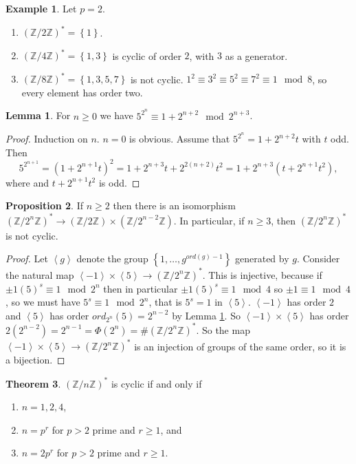 \documentclass{article}
\newcommand{\Z}{\mathbb{Z}}
\newcommand{\rb}[1]{\left( #1 \right)}
\newcommand{\cb}[1]{\left\{ #1 \right\}}
\newcommand{\ab}[1]{\left\langle #1 \right\rangle}
\theoremstyle{definition}\newtheorem{definition}{Definition}
\theoremstyle{definition}\newtheorem*{remark}{Remark}
\theoremstyle{definition}\newtheorem*{example}{Example}
\theoremstyle{definition}\newtheorem*{note}{Note}
\newtheorem{proposition}[definition]{Proposition}
\newtheorem{lemma}[definition]{Lemma}
\newtheorem{theorem}[definition]{Theorem}
\begin{document}
\begin{example}
Let $ p = 2 $.
\begin{enumerate}
\item $ \rb{\Z / 2\Z}^* = \cb{1} $.
\item $ \rb{\Z / 4\Z}^* = \cb{1, 3} $ is cyclic of order $ 2 $, with $ 3 $ as a generator.
\item $ \rb{\Z / 8\Z}^* = \cb{1, 3, 5, 7} $ is not cyclic. $ 1^2 \equiv 3^2 \equiv 5^2 \equiv 7^2 \equiv 1 \mod 8 $, so every element has order two.
\end{enumerate}
\end{example}

\begin{lemma}
\label{lem:27}
For $ n \ge 0 $ we have $ 5^{2^n} \equiv 1 + 2^{n + 2} \mod 2^{n + 3} $.
\end{lemma}

\begin{proof}
Induction on $ n $. $ n = 0 $ is obvious. Assume that $ 5^{2^n} = 1 + 2^{n + 2}t $ with $ t $ odd. Then
$$ 5^{2^{n + 1}} = \rb{1 + 2^{n + 1}t}^2 = 1 + 2^{n + 3}t + 2^{2\rb{n + 2}}t^2 = 1 + 2^{n + 3}\rb{t + 2^{n + 1}t^2}, $$
where and $ t + 2^{n + 1}t^2 $ is odd.
\end{proof}

\begin{proposition}
If $ n \ge 2 $ then there is an isomorphism $ \rb{\Z / 2^n\Z}^* \to \rb{\Z / 2\Z} \times \rb{\Z / 2^{n - 2}\Z} $. In particular, if $ n \ge 3 $, then $ \rb{\Z / 2^n\Z}^* $ is not cyclic.
\end{proposition}

\begin{proof}
Let $ \ab{g} $ denote the group $ \cb{1, \dots, g^{ord\rb{g} - 1}} $ generated by $ g $. Consider the natural map $ \ab{-1} \times \ab{5} \to \rb{\Z / 2^n\Z}^* $. This is injective, because if $ \pm 1\rb{5}^s \equiv 1 \mod 2^n $ then in particular $ \pm 1\rb{5}^s \equiv 1 \mod 4 $ so $ \pm 1 \equiv 1 \mod 4 $, so we must have $ 5^s \equiv 1 \mod 2^n $, that is $ 5^s = 1 $ in $ \ab{5} $. $ \ab{-1} $ has order $ 2 $ and $ \ab{5} $ has order $ ord_{2^n}\rb{5} = 2^{n - 2} $ by Lemma \ref{lem:27}. So $ \ab{-1} \times \ab{5} $ has order $ 2\rb{2^{n - 2}} = 2^{n - 1} = \Phi\rb{2^n} = \#\rb{\Z / 2^n\Z}^* $. So the map $ \ab{-1} \times \ab{5} \to \rb{\Z / 2^n\Z}^* $ is an injection of groups of the same order, so it is a bijection.
\end{proof}

\begin{theorem}
$ \rb{\Z / n\Z}^* $ is cyclic if and only if
\begin{enumerate}
\item $ n = 1, 2, 4 $,
\item $ n = p^r $ for $ p > 2 $ prime and $ r \ge 1 $, and
\item $ n = 2p^r $ for $ p > 2 $ prime and $ r \ge 1 $.
\end{enumerate}
\end{theorem}
\end{document}
